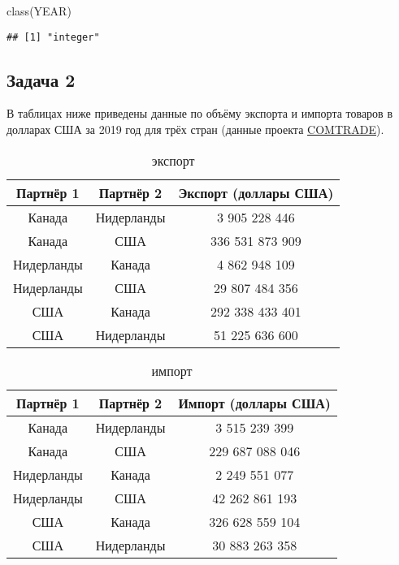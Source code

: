 \documentclass[
]{article}
\newenvironment{Shaded}{\begin{snugshade}}{\end{snugshade}}
\newcommand{\FunctionTok}[1]{\textcolor[rgb]{0.00,0.00,0.00}{#1}}
\newcommand{\NormalTok}[1]{#1}
\begin{document}
\begin{Shaded}
\begin{Highlighting}[]
\FunctionTok{class}\NormalTok{(YEAR)}
\end{Highlighting}
\end{Shaded}

\begin{verbatim}
## [1] "integer"
\end{verbatim}

\newpage

\hypertarget{ux437ux430ux434ux430ux447ux430-2}{%
\subsection{Задача 2}\label{ux437ux430ux434ux430ux447ux430-2}}

В таблицах ниже приведены данные по объёму экспорта и импорта товаров в
долларах США за 2019 год для трёх стран (данные проекта
\href{https://comtrade.un.org/}{COMTRADE}).

\begin{table}[ht!]
\centering
\caption{экспорт}
\begin{tabular}{|c|c|c|}
\hline
\textbf{Партнёр 1} & \textbf{Партнёр 2} & \textbf{Экспорт (доллары США)} \\
\hline
Канада & Нидерланды & 3 905 228 446\\
\hline
Канада & США & 336 531 873 909 \\
\hline
Нидерланды & Канада & 4 862 948 109 \\
\hline
Нидерланды & США & 29 807 484 356 \\
\hline
США & Канада & 292 338 433 401 \\
\hline
США & Нидерланды & 51 225 636 600\\
\hline
\end{tabular}
\end{table}

\begin{table}[ht!]
\centering
\caption{импорт}
\begin{tabular}{|c|c|c|}
\hline
\textbf{Партнёр 1} & \textbf{Партнёр 2} & \textbf{Импорт (доллары США)} \\
\hline
Канада & Нидерланды & 3 515 239 399\\
\hline
Канада & США & 229 687 088 046 \\
\hline
Нидерланды & Канада & 2 249 551 077 \\
\hline
Нидерланды & США & 42 262 861 193 \\
\hline
США & Канада & 326 628 559 104 \\
\hline
США & Нидерланды & 30 883 263 358\\
\hline
\end{tabular}
\end{table}
\end{document}

